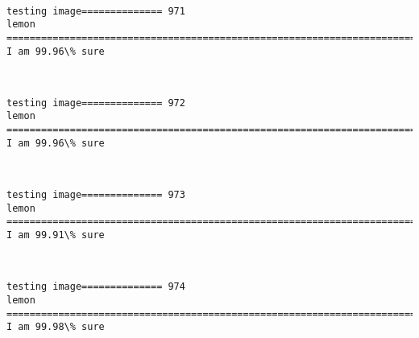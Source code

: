 \documentclass[11pt]{article}
\begin{document}
    \begin{center}
    \end{center}
    { \hspace*{\fill} \\}
    
    \begin{Verbatim}[commandchars=\\\{\}]
testing image============== 971
lemon
============================================================================
I am 99.96\% sure

    \end{Verbatim}

    \begin{center}
    \end{center}
    { \hspace*{\fill} \\}
    
    \begin{Verbatim}[commandchars=\\\{\}]
testing image============== 972
lemon
============================================================================
I am 99.96\% sure

    \end{Verbatim}

    \begin{center}
    \end{center}
    { \hspace*{\fill} \\}
    
    \begin{Verbatim}[commandchars=\\\{\}]
testing image============== 973
lemon
============================================================================
I am 99.91\% sure

    \end{Verbatim}

    \begin{center}
    \end{center}
    { \hspace*{\fill} \\}
    
    \begin{Verbatim}[commandchars=\\\{\}]
testing image============== 974
lemon
============================================================================
I am 99.98\% sure

    \end{Verbatim}
\end{document}
